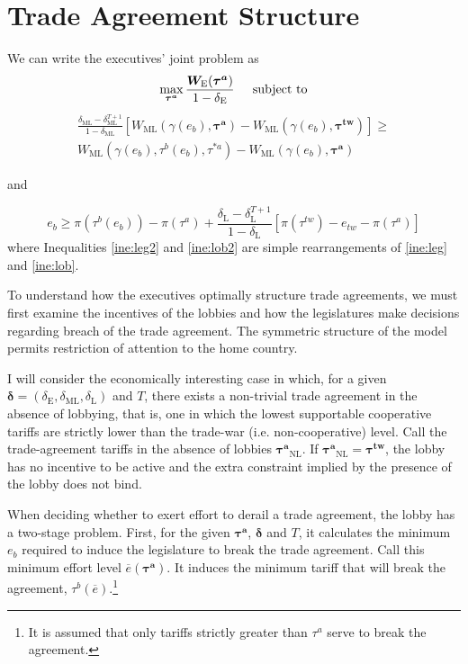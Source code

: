 \documentclass[authoryear, review]{elsarticle}
\newcommand{\ov}{\overline}
\newcommand{\bta}{\bm{\tau^a}}
\newcommand{\ga}{\gamma}
\newcommand{\btw}{\bm{\tau^{tw}}}
\newcommand{\de}{\delta}
\begin{document}
\section{Trade Agreement Structure}
\label{sec:structure}
We can write the executives' joint problem as
\begin{equation}
  \max_{\bta} \frac{\bm{W_\text{E}}(\bta)}{1-\de_\text{E}} \hskip.2in \text{subject to}
  \label{prob:max}
\end{equation}
\begin{multline}
  \frac{\de_\text{ML} - \de_\text{ML}^{T+1}}{1-\de_\text{ML}} \left[W_\text{ML}(\ga(e_b),\bta) - W_{\text{ML}}(\ga(e_b),\btw) \right] \geq \\
	W_{\text{ML}}(\ga(e_b),\tau^b(e_b),\tau^{*a}) - W_{\text{ML}}(\ga(e_b),\bta)
  \label{ine:leg2}
\end{multline}
\begin{center}
and
\end{center}
\begin{equation}
  e_b \geq \pi(\tau^b(e_b)) - \pi(\tau^a) + \frac{\de_\text{L} - \de_\text{L}^{T+1}}{1-\de_\text{L}} \left[\pi(\tau^{tw}) -e_{tw} - \pi(\tau^a) \right]
  \label{ine:lob2}
\end{equation}
where Inequalities \ref{ine:leg2} and \ref{ine:lob2} are simple rearrangements of \ref{ine:leg} and \ref{ine:lob}.

To understand how the executives optimally structure trade agreements, we must first examine the incentives of the lobbies and how the legislatures make decisions regarding breach of the trade agreement. The symmetric structure of the model permits restriction of attention to the home country.

I will consider the economically interesting case in which, for a given $\bm{\de}=\left(\de_\text{E},\de_\text{ML},\de_\text{L}\right)$ and $T$, there exists a non-trivial trade agreement in the absence of lobbying, that is, one in which the lowest supportable cooperative tariffs are strictly lower than the trade-war (i.e. non-cooperative) level. Call the trade-agreement tariffs in the absence of lobbies $\bta_{\text{NL}}$. If $\bta_{\text{NL}} = \btw$, the lobby has no incentive to be active and the extra constraint implied by the presence of the lobby does not bind.

When deciding whether to exert effort to derail a trade agreement, the lobby has a two-stage problem. First, for the given $\bta$, $\bm{\de}$ and $T$, it calculates the minimum $e_b$ required to induce the legislature to break the trade agreement. Call this minimum effort level $\ov{e}(\bta)$. It induces the minimum tariff that will break the agreement, $\tau^b(\ov{e})$.\footnote{It is assumed that only tariffs strictly greater than $\tau^a$ serve to break the agreement.}
\end{document}
